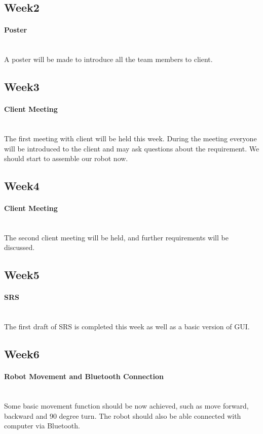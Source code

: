 \documentclass[11pt, a4paper]{report}
\begin{document}
\subsection{Week2}
\paragraph{Poster}\\
A poster will be made to introduce all the team members to client.

\subsection{Week3}
\paragraph{Client Meeting}\\
 The first meeting with client will be held this week. During the meeting everyone will be introduced to the client and may ask questions about the requirement. We should start to assemble our robot now.
 
\subsection{Week4}
\paragraph{Client Meeting}\\
The second client meeting will be held, and further requirements will be discussed. 

\subsection{Week5}
\paragraph{SRS}\\
The first draft of SRS is completed  this week as well as a basic version of GUI.


\subsection{Week6}
\paragraph{Robot Movement and Bluetooth Connection}\\
Some basic movement function should be now achieved, such as move forward, backward and 90 degree turn. The robot should also be able connected with computer via Bluetooth.
\end{document}
